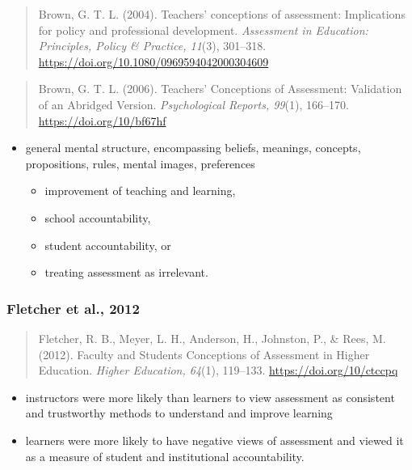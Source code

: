 \documentclass[
]{book}
\providecommand{\tightlist}{%
  \setlength{\itemsep}{0pt}\setlength{\parskip}{0pt}}
\begin{document}
\begin{quote}
Brown, G. T. L. (2004). Teachers' conceptions of assessment: Implications for policy and professional development. \emph{Assessment in Education: Principles, Policy \& Practice, 11}(3), 301--318. \url{https://doi.org/10.1080/0969594042000304609}
\end{quote}

\begin{quote}
Brown, G. T. L. (2006). Teachers' Conceptions of Assessment: Validation of an Abridged Version. \emph{Psychological Reports, 99}(1), 166--170. \url{https://doi.org/10/bf67hf}
\end{quote}

\begin{itemize}
\tightlist
\item
  general mental structure, encompassing beliefs, meanings, concepts, propositions, rules, mental images, preferences

  \begin{itemize}
  \tightlist
  \item
    improvement of teaching and learning,\\
  \item
    school accountability,\\
  \item
    student accountability, or\\
  \item
    treating assessment as irrelevant.
  \end{itemize}
\end{itemize}

\hypertarget{fletcher-et-al.-2012}{%
\subsubsection*{Fletcher et al., 2012}\label{fletcher-et-al.-2012}}

\begin{quote}
Fletcher, R. B., Meyer, L. H., Anderson, H., Johnston, P., \& Rees, M. (2012). Faculty and Students Conceptions of Assessment in Higher Education. \emph{Higher Education, 64}(1), 119--133. \url{https://doi.org/10/ctccpq}
\end{quote}

\begin{itemize}
\tightlist
\item
  instructors were more likely than learners to view assessment as consistent and trustworthy methods to understand and improve learning\\
\item
  learners were more likely to have negative views of assessment and viewed it as a measure of student and institutional accountability.
\end{itemize}
\end{document}
